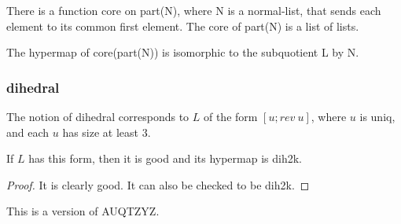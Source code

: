 There is a function core on part(N), where N is a normal-list, that sends each element to its common first element.
The core of part(N) is a list of lists.

\begin{lemma}\guid{}  The hypermap of core(part(N)) is isomorphic to the subquotient L by N. 
\end{lemma}

\subsubsection{dihedral}

The notion of dihedral corresponds to $L$ of the form $[u;rev~u]$, where $u$ is uniq, and each $u$ has size at least $3$.

\begin{lemma}\guid{} If $L$ has this form, then it is good and its hypermap is dih2k.
\end{lemma}

\begin{proof} It is clearly good. It can also be checked to be dih2k.
\end{proof}



This is a version of AUQTZYZ.

